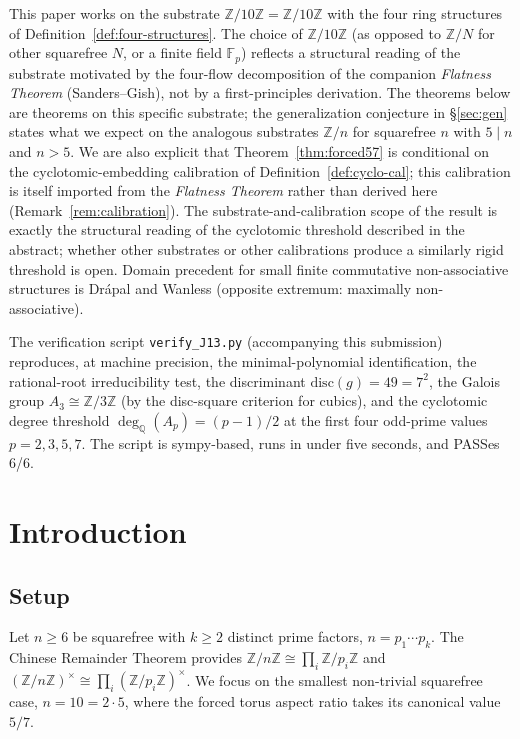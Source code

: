 \documentclass[11pt,reqno]{amsart}
\theoremstyle{plain}
\theoremstyle{definition}
\newcommand{\Z}{\mathbb{Z}}
\newcommand{\Q}{\mathbb{Q}}
\newcommand{\F}{\mathbb{F}}
\newcommand{\Zn}{\Z/n\Z}
\newcommand{\Zns}{(\Z/n\Z)^{\times}}
\newcommand{\Zts}{\Z/10\Z}
\newcommand{\disc}{\mathrm{disc}}
\begin{document}
This paper works on the substrate $\Zts = \Z/10\Z$ with the four ring structures of Definition~\ref{def:four-structures}. The choice of $\Zts$ (as opposed to $\Z/N$ for other squarefree $N$, or a finite field $\F_p$) reflects a structural reading of the substrate motivated by the four-flow decomposition of the companion \emph{Flatness Theorem} (Sanders--Gish), not by a first-principles derivation. The theorems below are theorems on this specific substrate; the generalization conjecture in \S\ref{sec:gen} states what we expect on the analogous substrates $\Z/n$ for squarefree $n$ with $5 \mid n$ and $n > 5$. We are also explicit that Theorem~\ref{thm:forced57} is conditional on the cyclotomic-embedding calibration of Definition~\ref{def:cyclo-cal}; this calibration is itself imported from the \emph{Flatness Theorem} rather than derived here (Remark~\ref{rem:calibration}). The substrate-and-calibration scope of the result is exactly the structural reading of the cyclotomic threshold described in the abstract; whether other substrates or other calibrations produce a similarly rigid threshold is open. Domain precedent for small finite commutative non-associative structures is Dr\'apal and Wanless \cite{DrapalWanless} (opposite extremum: maximally non-associative).

The verification script \texttt{verify\_J13.py} (accompanying this submission) reproduces, at machine precision, the minimal-polynomial identification, the rational-root irreducibility test, the discriminant $\disc(g) = 49 = 7^{2}$, the Galois group $A_{3} \cong \Z/3\Z$ (by the disc-square criterion for cubics), and the cyclotomic degree threshold $\deg_{\Q}(A_{p}) = (p-1)/2$ at the first four odd-prime values $p = 2, 3, 5, 7$. The script is sympy-based, runs in under five seconds, and PASSes 6/6.

\section{Introduction}

\subsection{Setup}

Let $n \geq 6$ be squarefree with $k \geq 2$ distinct prime factors, $n = p_1 \cdots p_k$. The Chinese Remainder Theorem provides $\Zn \cong \prod_i \Z/p_i\Z$ and $\Zns \cong \prod_i (\Z/p_i\Z)^{\times}$. We focus on the smallest non-trivial squarefree case, $n = 10 = 2 \cdot 5$, where the forced torus aspect ratio takes its canonical value $5/7$.
\end{document}
